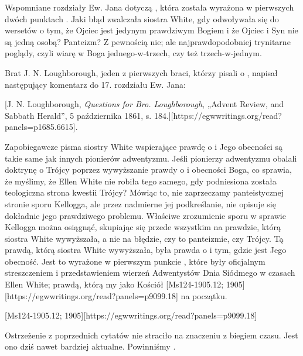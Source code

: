 Wspomniane rozdziały Ew. Jana dotyczą , która została wyrażona w pierwszych dwóch punktach . Jaki błąd zwalczała siostra White, gdy odwoływała się do wersetów o tym, że Ojciec jest jedynym prawdziwym Bogiem i że Ojciec i Syn nie są jedną osobą? Panteizm? Z pewnością nie; ale najprawdopodobniej trynitarne poglądy, czyli wiarę w Boga jednego-w-trzech, czy też trzech-w-jednym.

Brat J. N. Loughborough, jeden z pierwszych braci, którzy pisali o , napisał następujący komentarz do 17. rozdziału Ew. Jana:

[J. N. Loughborough, \textit{Questions for Bro. Loughborough}, „Advent Review, and Sabbath Herald”, 5 października 1861, s. 184.][https://egwwritings.org/read?panels=p1685.6615].

Zapobiegawcze pisma siostry White wspierające prawdę o  i Jego obecności są takie same jak innych pionierów adwentyzmu. Jeśli pionierzy adwentyzmu obalali doktrynę o Trójcy poprzez wywyższanie prawdy o  i obecności Boga, co sprawia, że myślimy, że Ellen White nie robiła tego samego, gdy podniesiona została teologiczna strona kwestii Trójcy? Mówiąc to, nie zaprzeczamy panteistycznej stronie sporu Kellogga, ale przez nadmierne jej podkreślanie, nie opisuje się dokładnie jego prawdziwego problemu. Właściwe zrozumienie sporu w sprawie Kellogga można osiągnąć, skupiając się przede wszystkim na prawdzie, którą siostra White wywyższała, a nie na błędzie, czy to panteizmie, czy Trójcy. Tą prawdą, którą siostra White wywyższała, była prawda o  i tym, gdzie jest Jego obecność. Jest to wyrażone w pierwszym punkcie , które były oficjalnym streszczeniem i przedstawieniem wierzeń Adwentystów Dnia Siódmego w czasach Ellen White; prawdą, którą my jako Kościół [Ms124-1905.12; 1905][https://egwwritings.org/read?panels=p9099.18] na początku.

[Ms124-1905.12; 1905][https://egwwritings.org/read?panels=p9099.18]

Ostrzeżenie z poprzednich cytatów nie straciło na znaczeniu z biegiem czasu. Jest ono dziś nawet bardziej aktualne. Powinniśmy .


